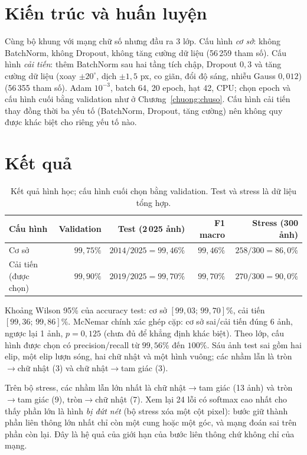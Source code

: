 \section{Kiến trúc và huấn luyện}
Cùng bộ khung với mạng chữ số nhưng đầu ra 3 lớp. Cấu hình \emph{cơ sở}: không BatchNorm, không Dropout, không tăng cường dữ liệu (56\,259 tham số). Cấu hình \emph{cải tiến}: thêm BatchNorm \cite{ioffe2015} sau hai
tầng tích chập, Dropout $0{,}3$ \cite{srivastava2014} và tăng cường dữ liệu (xoay $\pm20^{\circ}$, dịch $\pm1{,}5$ px, co giãn, đổi độ sáng, nhiễu Gauss $0{,}012$) (56\,355 tham số).
Adam $10^{-3}$, batch 64, 20 epoch, hạt 42, CPU; chọn epoch và cấu hình cuối bằng validation như ở Chương~\ref{chuong:chuso}.
Cấu hình cải tiến thay đồng thời ba yếu tố (BatchNorm, Dropout, tăng cường) nên không quy được khác biệt cho riêng yếu tố nào.

\section{Kết quả}
\begin{table}[H]\centering
\begin{tabular}{lrrrr}
\toprule
Cấu hình & Validation & Test (2\,025 ảnh) & F1 macro & Stress (300 ảnh) \\
\midrule
Cơ sở & $99{,}75\%$ & $2014/2025=99{,}46\%$ & $99{,}46\%$ & $258/300=86{,}0\%$ \\
Cải tiến (được chọn) & $99{,}90\%$ & $2019/2025=99{,}70\%$ & $99{,}70\%$ & $270/300=90{,}0\%$ \\
\bottomrule
\end{tabular}
\caption{Kết quả hình học; cấu hình cuối chọn bằng validation. Test và stress là dữ liệu tổng hợp.}
\end{table}
Khoảng Wilson 95\% của accuracy test: cơ sở $[99{,}03;\,99{,}70]\%$, cải tiến $[99{,}36;\,99{,}86]\%$. McNemar chính xác ghép cặp: cơ sở sai/cải tiến đúng 6 ảnh, ngược lại 1 ảnh, $p=0{,}125$
(chưa đủ để khẳng định khác biệt). Theo lớp, cấu hình được chọn có precision/recall từ $99{,}56\%$ đến $100\%$.
Sáu ảnh test sai gồm hai elip, một elip lượn sóng, hai chữ nhật và một hình vuông; các nhầm lẫn là tròn$\to$chữ nhật (3) và chữ nhật$\to$tam giác (3).


Trên bộ stress, các nhầm lẫn lớn nhất là chữ nhật$\to$tam giác (13 ảnh) và tròn$\to$tam giác (9), tròn$\to$chữ nhật (7). Xem lại 24 lỗi có softmax cao nhất cho thấy phần lớn là hình \emph{bị đứt nét} (bộ stress xóa một cột pixel): bước giữ thành phần liên thông lớn nhất chỉ còn một cung hoặc một góc, và mạng đoán sai trên phần còn lại. Đây là hệ quả của giới hạn của bước liên thông chứ không chỉ của mạng.

